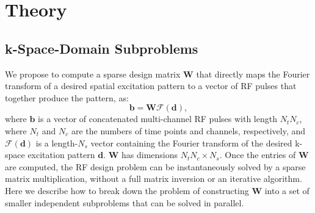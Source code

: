 \section*{Theory}

\subsection*{k-Space-Domain Subproblems}
We propose to compute a sparse 
design matrix $\bm{W}$ that directly maps the Fourier transform of a desired spatial 
excitation pattern to a vector of RF pulses that together produce the pattern, as:
\begin{equation}
\bm{b} = \bm{W} \mathcal{F}(\bm{d}),
\end{equation}
where $\bm{b}$ is a vector of concatenated multi-channel RF pulses with length $N_t  N_c$, 
where $N_t$ and $N_c$ are the numbers of time points and channels, respectively,
and $\mathcal{F}(\bm{d})$ is a length-$N_s$ vector containing the 
Fourier transform of the desired k-space excitation pattern $\bm{d}$.
$\bm{W}$ has dimensions $N_t  N_c \times N_s$.
Once the entries of $\bm{W}$ are computed, 
the RF design problem can be instantaneously solved by a sparse matrix multiplication, 
without a full matrix inversion or an iterative algorithm. 
Here we describe how to break down the problem of constructing $\bm{W}$ 
into a set of smaller independent subproblems that can be solved in parallel. 



